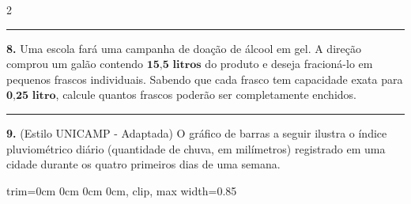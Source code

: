 \documentclass[twoside, 10pt, a4paper]{article}
\newlength{\espacoPreQuestao}\setlength{\espacoPreQuestao}{0.1cm}
\newlength{\espacoQuestao}\setlength{\espacoQuestao}{0.2cm}
\newcommand{\larguraTikz}{0.85\linewidth}
\begin{document}
\begin{multicols*}{2}
\noindent\textcolor{CorLinha}{\rule{\linewidth}{0.5pt}} 
\par\vspace{\espacoPreQuestao}
\textbf{8.} Uma escola fará uma campanha de doação de álcool em gel. A direção comprou um galão contendo $ \textbf{15,5 litros} $ do produto e deseja fracioná-lo em pequenos frascos individuais. Sabendo que cada frasco tem capacidade exata para $ \textbf{0,25 litro} $, calcule quantos frascos poderão ser completamente enchidos.
\par\vspace{\espacoQuestao}

\noindent\textcolor{CorLinha}{\rule{\linewidth}{0.5pt}} 
\par\vspace{\espacoPreQuestao}
\textbf{9.} (Estilo UNICAMP - Adaptada) O gráfico de barras a seguir ilustra o índice pluviométrico diário (quantidade de chuva, em milímetros) registrado em uma cidade durante os quatro primeiros dias de uma semana.
\begin{center}
\begin{adjustbox}{trim=0cm 0cm 0cm 0cm, clip, max width=\larguraTikz}
\end{adjustbox}
\end{center}
\end{multicols*}
\end{document}

